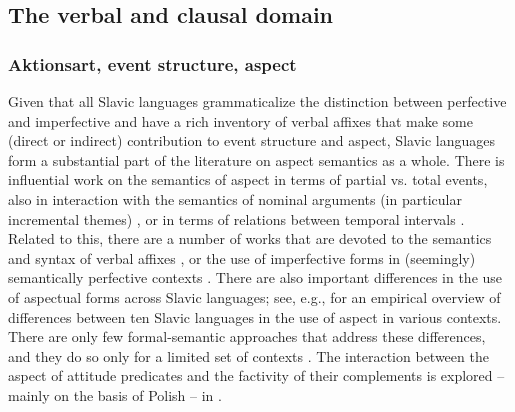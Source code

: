 \documentclass[output=paper,colorlinks,citecolor=brown]{langscibook}
\begin{document}
\subsection{The verbal and clausal domain}

\subsubsection{Aktionsart, event structure, aspect}\label{sec:GS:aktionsart} Given that all Slavic languages grammaticalize the distinction between perfective and imperfective and have a rich inventory of verbal affixes that make some (direct or indirect) contribution to event structure and aspect, Slavic languages form a substantial part of the literature on aspect semantics as a whole. There is influential work on the semantics of aspect in terms of partial vs. total events, also in interaction with the semantics of nominal arguments (in particular incremental themes) \citep{filip93,Filip1999}, or in terms of relations between temporal intervals \citep{Klein1994,Klein1995,borik02,Borik2006,gronndiss,gronn15,Tatevosov2011,Tatevosov2015b,altshuler14}. Related to this, there are a number of works that are devoted to the semantics and syntax of verbal affixes   \citep{filip03,Filip2005,mlynarczyk04,souckova04,arsenijevic06,tatevosov08pref,gehrkelagb,Gehrke2008,zaucerdiss,Kagan15,zinovadiss,Biskup2019,Biskup2025,Naumov2020,Docekal.etal2023,Karagjosova2024}, or the use of imperfective forms in (seemingly) semantically perfective contexts \citep{gronndiss,gronn15,Altshuler2012,muellerkrat,muellerreichau15,alvestad14,Borik.Gehrke2018,klimek22,gehrketrueipf}. There are also important differences in the use of aspectual forms across Slavic languages; see, e.g., \citet{Dickey2000} for an empirical overview of differences between ten Slavic languages in the use of aspect in various contexts. There are only few formal-semantic approaches that address these differences, and they do so only for a limited set of contexts \citep[][]{alvestad14,Mueller-Reichau2018a,mueller23,gehrke22,klimek22}. The interaction between the aspect of attitude predicates and the factivity of their complements is explored -- mainly on the basis of Polish -- in \citet{Zuchewicz2018,Zuchewicz2020}.

\end{document}
